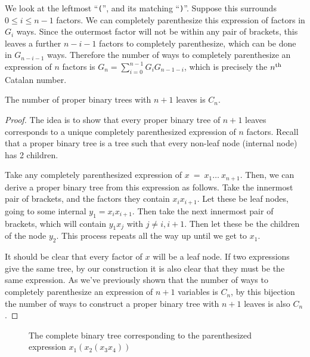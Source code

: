 We look at the leftmost ``\texttt{(}'', and its matching ``\texttt{)}''. Suppose this surrounds $0 \leq i \leq n-1$ factors. We can completely parenthesize this expression of factors in $G_{i}$ ways. Since the outermost factor will not be within any pair of brackets, this leaves a further $n-i-1$ factors to completely parenthesize, which can be done in $G_{n-i-1}$ ways. Therefore the number of ways to completely parenthesize an expression of $n$ factors is ${G_{n}=\sum_{i=0}^{n-1}G_{i}G_{n-1-i}}$, which is precisely the $n\textsuperscript{th}$ Catalan number.
\begin{theorem}
    The number of proper binary trees with $n+1$ leaves is $C_n$.
\end{theorem}
\begin{proof}
    The idea is to show that every proper binary tree of $n+1$ leaves corresponds to a unique completely parenthesized expression of $n$ factors. Recall that a proper binary tree is a tree such that every non-leaf node (internal node) has 2 children.
    
    Take any completely parenthesized expression of $x~=~x_{1}\dots~x_{n+1}$. Then, we can derive a proper binary tree from this expression as follows. Take the innermost pair of brackets, and the factors they contain $x_ix_{i+1}$. Let these be leaf nodes, going to some internal $y_1 = x_ix_{i+1}$. Then take the next innermost pair of brackets, which will contain $y_1x_j$ with $j\neq i,i+1$. Then let these be the children of the node $y_2$. This process repeats all the way up until we get to $x_1$. 
    
    It should be clear that every factor of $x$ will be a leaf node. If two expressions give the same tree, by our construction it is also clear that they must be the same expression. As we've previously shown that the number of ways to completely parenthesize an expression of $n+1$ variables is $C_n$, by this bijection the number of ways to construct a proper binary tree with $n+1$ leaves is also $C_n$.
\end{proof}

\begin{figure}[H]
    \centering
    
    \caption{The complete binary tree corresponding to the parenthesized expression $x_1(x_2(x_3x_4))$}
    \label{fig:completeBinTree}
\end{figure}



